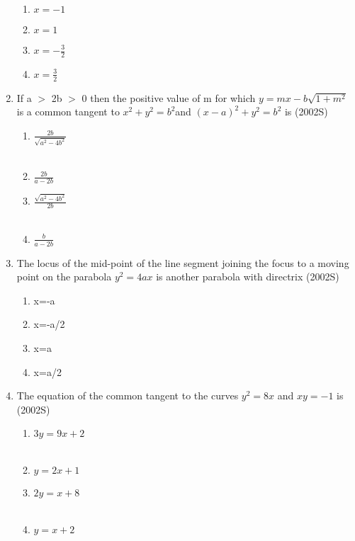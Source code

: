 \begin{enumerate}
     \hfill {}
\begin{enumerate}
    \item $x=-1$
    \item $x=1$
    \item $x=-\frac{3}{2}$
     \item $x=\frac{3}{2}$
\end{enumerate}
\item If a $>$ 2b $>$ 0 then the positive value of m for which       $y=mx-b\sqrt{1+m^{2}} $ is a common tangent to $x^{2} + y^{2} = b^{2} $and  $(x-a)^{2} + y^{2} = b^{2}$ is   \hfill {(2002S)}
\begin{multicols}{2}
\begin{enumerate}
    \item $\frac{2b}{\sqrt{a^{2}-4b^{2}}}$\\\\
    \item $\frac{2b}{a-2b}$
    \item $\frac{\sqrt{a^{2}-4b^{2}}}{2b}$\\\\
    \item $\frac{b}{a-2b}$
\end{enumerate} 
\end{multicols}
\item The locus of the mid-point of the line segment joining the focus to a moving point on the parabola $y^{2} = 4ax$ is another parabola with directrix \hfill{(2002S)}
\begin{multicols}{4}
 \begin{enumerate}
    \item x=-a
    \item x=-a/2
    \item x=a
    \item x=a/2
 \end{enumerate}
\end{multicols}
\item The equation of the common tangent to the curves $y^{2}=8x$ and $xy=-1$ is \hfill{(2002S)}
\begin{multicols}{2}
\begin{enumerate}
    \item $3y=9x+2$\\\\
    \item $y=2x+1$
    \item $2y=x+8$\\\\
    \item $y=x+2$

\end{enumerate}
\end{multicols}
\end{enumerate}
